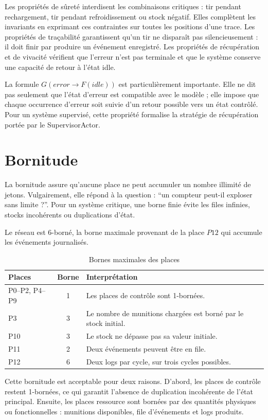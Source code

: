 \documentclass[11pt,a4paper]{report}
\begin{document}
Les propriétés de sûreté interdisent les combinaisons critiques : tir pendant rechargement, tir pendant refroidissement ou stock négatif. Elles complètent les invariants en exprimant ces contraintes sur toutes les positions d'une trace. Les propriétés de traçabilité garantissent qu'un tir ne disparaît pas silencieusement : il doit finir par produire un événement enregistré. Les propriétés de récupération et de vivacité vérifient que l'erreur n'est pas terminale et que le système conserve une capacité de retour à l'état idle.

La formule $G(error \rightarrow F(idle))$ est particulièrement importante. Elle ne dit pas seulement que l'état d'erreur est compatible avec le modèle ; elle impose que chaque occurrence d'erreur soit suivie d'un retour possible vers un état contrôlé. Pour un système supervisé, cette propriété formalise la stratégie de récupération portée par le SupervisorActor.

\section{Bornitude}
La bornitude assure qu'aucune place ne peut accumuler un nombre illimité de jetons. Vulgairement, elle répond à la question : ``un compteur peut-il exploser sans limite ?''. Pour un système critique, une borne finie évite les files infinies, stocks incohérents ou duplications d'état.

Le réseau est 6-borné, la borne maximale provenant de la place $P12$ qui accumule les événements journalisés.

\begin{table}[H]
\centering
\caption{Bornes maximales des places}
\begin{tabularx}{\textwidth}{lCY}
\toprule
Places & Borne & Interprétation \\
\midrule
P0--P2, P4--P9 & 1 & Les places de contrôle sont 1-bornées. \\
P3 & 3 & Le nombre de munitions chargées est borné par le stock initial. \\
P10 & 3 & Le stock ne dépasse pas sa valeur initiale. \\
P11 & 2 & Deux événements peuvent être en file. \\
P12 & 6 & Deux logs par cycle, sur trois cycles possibles. \\
\bottomrule
\end{tabularx}
\end{table}

Cette bornitude est acceptable pour deux raisons. D'abord, les places de contrôle restent 1-bornées, ce qui garantit l'absence de duplication incohérente de l'état principal. Ensuite, les places ressource sont bornées par des quantités physiques ou fonctionnelles : munitions disponibles, file d'événements et logs produits.
\end{document}
